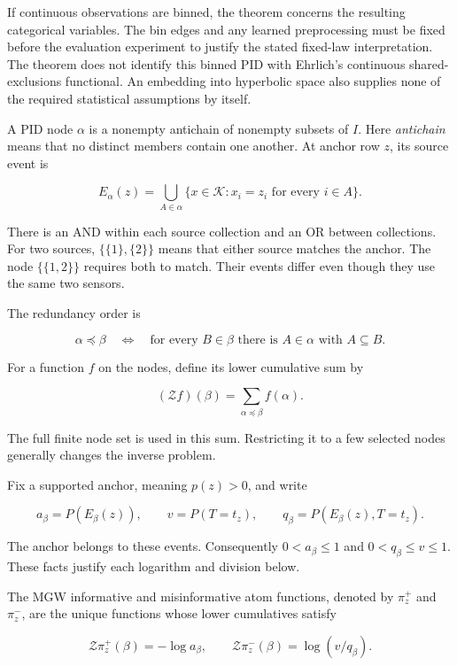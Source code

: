 If continuous observations are binned, the theorem concerns the resulting categorical variables. The bin edges and any learned preprocessing must be fixed before the evaluation experiment to justify the stated fixed-law interpretation. The theorem does not identify this binned PID with Ehrlich's continuous shared-exclusions functional. An embedding into hyperbolic space also supplies none of the required statistical assumptions by itself.

\label{a-node-is-a-collection-of-alternatives}

A PID node \(\alpha\) is a nonempty antichain of nonempty subsets of \(I\). Here \emph{antichain} means that no distinct members contain one another. At anchor row \(z\), its source event is

\[
E_\alpha(z)=
\bigcup_{A\in\alpha}
\{x\in\mathcal K:x_i=z_i\text{ for every }i\in A\}.
\]

There is an AND within each source collection and an OR between collections. For two sources, \(\{\{1\},\{2\}\}\) means that either source matches the anchor. The node \(\{\{1,2\}\}\) requires both to match. Their events differ even though they use the same two sensors.

The redundancy order is

\[
\alpha\preceq\beta
\quad\Longleftrightarrow\quad
\text{for every }B\in\beta\text{ there is }A\in\alpha\text{ with }A\subseteq B.
\]

For a function \(f\) on the nodes, define its lower cumulative sum by

\[
(\mathcal Zf)(\beta)=\sum_{\alpha\preceq\beta}f(\alpha).
\]

The full finite node set is used in this sum. Restricting it to a few selected nodes generally changes the inverse problem.

Fix a supported anchor, meaning \(p(z)>0\), and write

\[
a_\beta=P(E_\beta(z)),\qquad
v=P(T=t_z),\qquad
q_\beta=P(E_\beta(z),T=t_z).
\]

The anchor belongs to these events. Consequently \(0<a_\beta\le1\) and \(0<q_\beta\le v\le1\). These facts justify each logarithm and division below.

The MGW informative and misinformative atom functions, denoted by \(\pi_z^+\) and \(\pi_z^-\), are the unique functions whose lower cumulatives satisfy

\[
\mathcal Z\pi_z^+(\beta)=-\log a_\beta,
\qquad
\mathcal Z\pi_z^-(\beta)=\log(v/q_\beta).
\]


